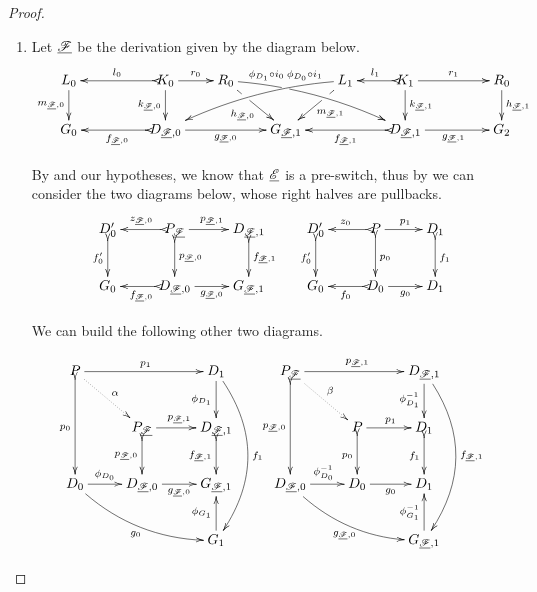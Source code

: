 \begin{proof}
		\begin{enumerate} 
	\item 		Let $\underline{\mathscr{F}}$ be the derivation given by the diagram below.
\[
\xymatrix@R=20pt@C=20pt{
	{L_0} \ar[d]_{m_{\der{F}, 0}}
	&&  {K_0} \ar@{>->}[ll]_{l_0} \ar[r]^{r_0} \ar[d]_{k_{\der{F}, 0}}
	&  {R_0} \ar[dr]|(.33)\hole_{h_{\der{F}, 0}}  \ar@/^.25cm/@{>}^(.2){\phi_{D_1} \circ i_0}|(.32)\hole[drrr]
	& & 
	{L_1}\ar[dl]|(.33)\hole^{m_{\der{F}, 1}} \ar@/_.25cm/[dlll]_(.2){\phi_{D_0} \circ i_1} 
	&  {K_1} \ar@{>->}[l]_{l_1} \ar[rr]^{r_1} \ar[d]^{k_{\der{F}, 1}}
	& & {R_0} \ar[d]^{h_{\der{F}, 1}} \\		
	{G_0}
	& & {D_{\der{F},0}} \ar@{>->}[ll]^{f_{\der{F}, 0}} \ar[rr]_{g_{\der{F}, 0}}
	& &  {G_{\der{F}, 1}} 
	& &  {D_{\der{F}, 1}} \ar@{>->}[ll]^{f_{\der{F}, 1}} \ar[rr]_{g_{\der{F}, 1}}
	& & {G_2}  }
\]

By  and our hypotheses, we know that $\underline{\mathscr{E}}$ is a pre-switch, thus by  we can consider the two diagrams below, whose right halves are pullbacks.
\[\xymatrix{D'_0 \ar@{>->}[d]_{f'_0}& P_{\der{F}} \ar@{>->}[d]^{p_{\der{F},0}} \ar[r]^{p_{\der{F},1}}\ar@{>->}[l]_{z_{\der{F},0}} & D_{\der{F},1} \ar@{>->}[d]^{f_{\der{F},1}}& D'_0 \ar@{>->}[d]_{f'_0} & P \ar[r]^{p_1} \ar@{>->}[d]^{p_0} \ar@{>->}[l]_{z_0}& D_1 \ar@{>->}[d]^{f_1}\\ G_0 & D_{\der{F}, 0} \ar[r]_{g_{\der{F},0}} \ar@{>->}[l]^{f_{\der{F},0}} & G_{\der{F},1} & G_0 & D_0 \ar[r]_{g_{0}} \ar@{>->}[l]^{f_{0}} & D_1}\]

We can build the following other two diagrams.
	
\[\xymatrix{P \ar[rr]^{p_1} \ar@{>->}[dd]_{p_0} \ar@{.>}[dr]^{\alpha}&& D_1 \ar[d]_{\phi_{D_1}} \ar@/^.8cm/[ddd]^{f_1}& P_{\der{F}} \ar@{.>}[dr]^{\beta}\ar[rr]^{p_{\der{F},1}} \ar@{>->}[dd]_{p_{\der{F},0}} &&D_{\der{F},1} \ar[d]_{\phi^{-1}_{D_1}} \ar@/^.8cm/[ddd]^{f_{\der{F},1}}\\& P_{\der{F}} \ar@{>->}[d]_{p_{\der{F},0}} \ar[r]^{p_{\der{F},1}} & D_{\der{F},1} \ar@{>->}[d]_{f_{\der{F},1}}&  & P \ar[r]^{p_1} \ar@{>->}[d]_{p_0} & D_1 \ar@{>->}[d]_{f_1}\\ D_0  \ar@/_.4cm/[drr]_{g_0}\ar[r]^-{\phi_{D_0}} & D_{\der{F}, 0} \ar[r]_{g_{\der{F},0}}  & G_{\der{F},1} & D_{\der{F},0} \ar@/_.4cm/[drr]_{g_{\der{F},0}} \ar[r]^{\phi^{-1}_{D_0}}& D_0 \ar[r]_{g_{0}}  & D_1 \\ && G_1 \ar[u]^{\phi_{G_1}}&&&G_{\der{F},1} \ar[u]^{\phi^{-1}_{G_1}}}\]	
	

\end{enumerate}
\end{proof}
